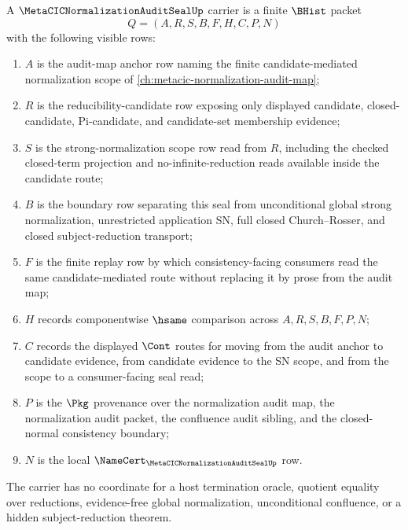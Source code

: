 \begin{definition}
\label{def:metacic-normalization-audit-seal-carrier}
A $\MetaCICNormalizationAuditSealUp$ carrier is a finite $\BHist$ packet
$$
Q=(A,R,S,B,F,H,C,P,N)
$$
with the following visible rows:
\begin{enumerate}
\item $A$ is the audit-map anchor row naming the finite candidate-mediated normalization scope of \autoref{ch:metacic-normalization-audit-map};
\item $R$ is the reducibility-candidate row exposing only displayed candidate, closed-candidate, Pi-candidate, and candidate-set membership evidence;
\item $S$ is the strong-normalization scope row read from $R$, including the checked closed-term projection and no-infinite-reduction reads available inside the candidate route;
\item $B$ is the boundary row separating this seal from unconditional global strong normalization, unrestricted application SN, full closed Church--Rosser, and closed subject-reduction transport;
\item $F$ is the finite replay row by which consistency-facing consumers read the same candidate-mediated route without replacing it by prose from the audit map;
\item $H$ records componentwise $\hsame$ comparison across $A,R,S,B,F,P,N$;
\item $C$ records the displayed $\Cont$ routes for moving from the audit anchor to candidate evidence, from candidate evidence to the SN scope, and from the scope to a consumer-facing seal read;
\item $P$ is the $\Pkg$ provenance over the normalization audit map, the normalization audit packet, the confluence audit sibling, and the closed-normal consistency boundary;
\item $N$ is the local $\NameCert_{\MetaCICNormalizationAuditSealUp}$ row.
\end{enumerate}
The carrier has no coordinate for a host termination oracle, quotient equality over reductions, evidence-free global normalization, unconditional confluence, or a hidden subject-reduction theorem.
\end{definition}

